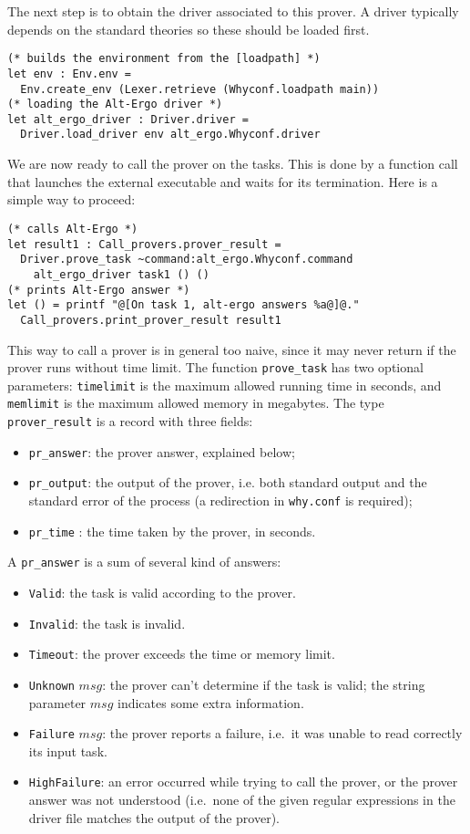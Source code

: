 The next step is to obtain the driver associated to this prover. A
driver typically depends on the standard theories so these should be
loaded first.
\begin{verbatim}
(* builds the environment from the [loadpath] *)
let env : Env.env =
  Env.create_env (Lexer.retrieve (Whyconf.loadpath main))
(* loading the Alt-Ergo driver *)
let alt_ergo_driver : Driver.driver =
  Driver.load_driver env alt_ergo.Whyconf.driver
\end{verbatim}

We are now ready to call the prover on the tasks. This is done by a
function call that launches the external executable and waits for its
termination. Here is a simple way to proceed:
\begin{verbatim}
(* calls Alt-Ergo *)
let result1 : Call_provers.prover_result =
  Driver.prove_task ~command:alt_ergo.Whyconf.command
    alt_ergo_driver task1 () ()
(* prints Alt-Ergo answer *)
let () = printf "@[On task 1, alt-ergo answers %a@]@."
  Call_provers.print_prover_result result1
\end{verbatim}
This way to call a prover is in general too naive, since it may never
return if the prover runs without time limit. The function
\texttt{prove\_task} has two optional parameters: \texttt{timelimit}
is the maximum allowed running time in seconds, and \texttt{memlimit}
is the maximum allowed memory in megabytes.  The type
\texttt{prover\_result} is a record with three fields:
\begin{itemize}
\item \texttt{pr\_answer}: the prover answer, explained below;
\item \texttt{pr\_output}: the output of the prover, i.e. both
  standard output and the standard error of the process
  (a redirection in \texttt{why.conf} is required);
\item \texttt{pr\_time} : the time taken by the prover, in seconds.
\end{itemize}
A \texttt{pr\_answer} is a sum of several kind of answers:
\begin{itemize}
\item \texttt{Valid}: the task is valid according to the prover.
\item \texttt{Invalid}: the task is invalid.
\item \texttt{Timeout}: the prover exceeds the time or memory limit.
\item \texttt{Unknown} $msg$: the prover can't determine if the task
  is valid; the string parameter $msg$ indicates some extra
  information.
\item \texttt{Failure} $msg$: the prover reports a failure, i.e.~it
  was unable to read correctly its input task.
\item \texttt{HighFailure}: an error occurred while trying to call the
  prover, or the prover answer was not understood (i.e.~none of the
  given regular expressions in the driver file matches the output
  of the prover).
\end{itemize}
